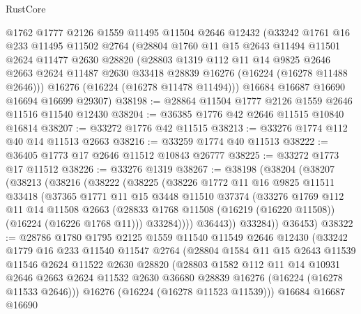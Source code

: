 \begin{lexlean}{RustCore}
\begin{coremodule}
    @1762
    @1777
    @2126
    @1559
    @11495
    @11504
    @2646
    @12432
    (@33242
      @1761
      @16
      @233
      @11495
      @11502
      @2764
      (@28804
        @1760
        @11
        @15
        @2643
        @11494
        @11501
        @2624
        @11477
        @2630
        @28820
        (@28803
          @1319
          @112
          @11
          @14
          @9825
          @2646
          @2663
          @2624
          @11487
          @2630
          @33418
          @28839
          @16276
          (@16224 (@16278 @11488 @2646)))
        @16276
        (@16224 (@16278 @11478 @11494)))
      @16684
      @16687
      @16690
      @16694
      @16699
      @29307)
@38198 := @28864 @11504 @1777 @2126 @1559 @2646 @11516 @11540 @12430
@38204 := @36385 @1776 @42 @2646 @11515 @10840 @16814
@38207 := @33272 @1776 @42 @11515
@38213 := @33276 @1774 @112 @40 @14 @11513 @2663
@38216 := @33259 @1774 @40 @11513
@38222 := @36405 @1773 @17 @2646 @11512 @10843 @26777
@38225 := @33272 @1773 @17 @11512
@38226 := @33276 @1319
@38267 := @38198
    (@38204
      (@38207
        (@38213
          (@38216
            (@38222
              (@38225
                (@38226
                  @1772
                  @11
                  @16
                  @9825
                  @11511
                  @33418
                  (@37365
                    @1771
                    @11
                    @15
                    @3448
                    @11510
                    @37374
                    (@33276
                      @1769
                      @112
                      @11
                      @14
                      @11508
                      @2663
                      (@28833 @1768 @11508 (@16219 (@16220 @11508)) (@16224 (@16226 @1768 @11)))
                      @33284))))
              @36443))
          @33284))
      @36453)
@38322 := @28786
    @1780
    @1795
    @2125
    @1559
    @11540
    @11549
    @2646
    @12430
    (@33242
      @1779
      @16
      @233
      @11540
      @11547
      @2764
      (@28804
        @1584
        @11
        @15
        @2643
        @11539
        @11546
        @2624
        @11522
        @2630
        @28820
        (@28803
          @1582
          @112
          @11
          @14
          @10931
          @2646
          @2663
          @2624
          @11532
          @2630
          @36680
          @28839
          @16276
          (@16224 (@16278 @11533 @2646)))
        @16276
        (@16224 (@16278 @11523 @11539)))
      @16684
      @16687
      @16690

\end{coremodule}
\end{lexlean}

